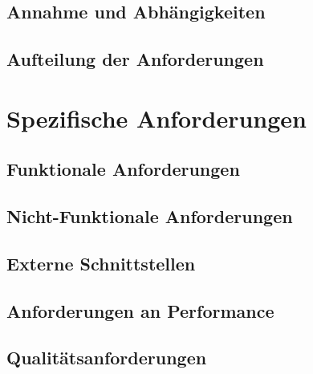 \documentclass[a4paper]{book}
\begin{document}
\section{Annahme und Abhängigkeiten}
\blindtext

\section{Aufteilung der Anforderungen}
\blindtext

\chapter{Spezifische Anforderungen}
\blindtext

\section{Funktionale Anforderungen}
\blindtext

\section{Nicht-Funktionale Anforderungen}
\blindtext

\section{Externe Schnittstellen}
\blindtext

\section{Anforderungen an Performance}
\blindtext

\section{Qualitätsanforderungen}
\blindtext
\end{document}
